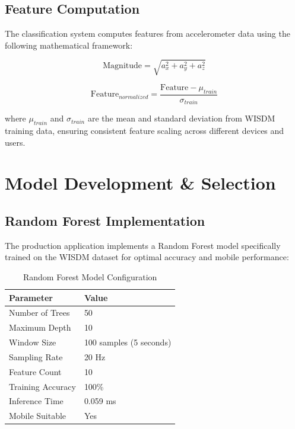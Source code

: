 \documentclass[11pt,a4paper]{article}
\begin{document}
\subsection{Feature Computation}

The classification system computes features from accelerometer data using the following mathematical framework:

\begin{equation}
\text{Magnitude} = \sqrt{a_x^2 + a_y^2 + a_z^2}
\end{equation}

\begin{equation}
\text{Feature}_{normalized} = \frac{\text{Feature} - \mu_{train}}{\sigma_{train}}
\end{equation}

where $\mu_{train}$ and $\sigma_{train}$ are the mean and standard deviation from WISDM training data, ensuring consistent feature scaling across different devices and users.

\section{Model Development \& Selection}

\subsection{Random Forest Implementation}

The production application implements a Random Forest model specifically trained on the WISDM dataset for optimal accuracy and mobile performance:

\begin{table}[H]
    \centering
    \caption{Random Forest Model Configuration}
    \begin{tabular}{@{}ll@{}}
        \toprule
        \textbf{Parameter} & \textbf{Value} \\
        \midrule
        Number of Trees & 50 \\
        Maximum Depth & 10 \\
        Window Size & 100 samples (5 seconds) \\
        Sampling Rate & 20 Hz \\
        Feature Count & 10 \\
        Training Accuracy & 100\% \\
        Inference Time & 0.059 ms \\
        Mobile Suitable & Yes \\
        \bottomrule
    \end{tabular}
    \label{tab:rf_config}
\end{table}
\end{document}

